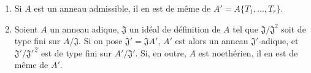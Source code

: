 \begin{proposition}[7.5.4]
\label{0.7.5.4-fr}
\begin{enumerate}
  \item[\textup{(i)}] Si $A$ est un anneau admissible, il en est de même de
  $A'=A\{T_1,\ldots,T_r\}$.
  \item[\textup{(ii)}] Soient $A$ un anneau adique, $\mathfrak J$ un idéal de définition
  de $A$ tel que $\mathfrak J/\mathfrak J^2$ soit de type fini
  sur $A/\mathfrak J$. Si on pose $\mathfrak J'=\mathfrak JA'$, $A'$ est alors
  un anneau $\mathfrak J'$-adique, et
  $\mathfrak J'/\mathfrak J'^{\,2}$ est de type fini sur
  $A'/\mathfrak J'$. Si, en outre, $A$ est noethérien, il en est de même de
  $A'$.
\end{enumerate}
\end{proposition}

